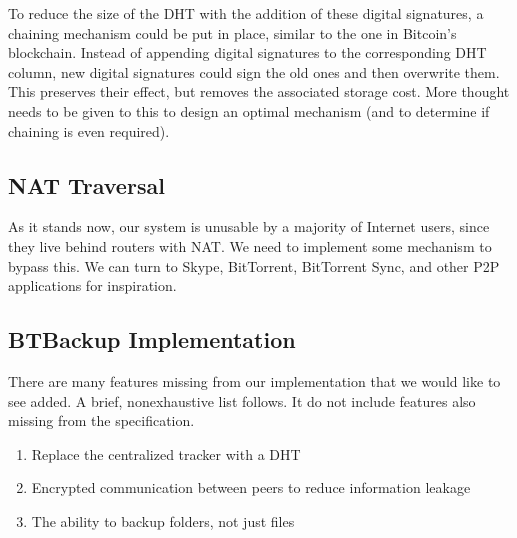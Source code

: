 \documentclass[12pt]{report}
\begin{document}
To reduce the size of the DHT with the addition of these digital signatures, a chaining mechanism could be put in place, similar to the one in Bitcoin's blockchain. Instead of appending digital signatures to the corresponding DHT column, new digital signatures could sign the old ones and then overwrite them. This preserves their effect, but removes the associated storage cost. More thought needs to be given to this to design an optimal mechanism (and to determine if chaining is even required).


\subsection{NAT Traversal}

As it stands now, our system is unusable by a majority of Internet users, since they live behind routers with NAT. We need to implement some mechanism to bypass this. We can turn to Skype, BitTorrent, BitTorrent Sync, and other P2P applications for inspiration.

\subsection{BTBackup Implementation}

There are many features missing from our implementation that we would like to see added. A brief, nonexhaustive list follows. It do not include features also missing from the specification.

\begin{enumerate}
    \item Replace the centralized tracker with a DHT
    \item Encrypted communication between peers to reduce information leakage
    \item The ability to backup folders, not just files
\end{enumerate}


\end{document}
